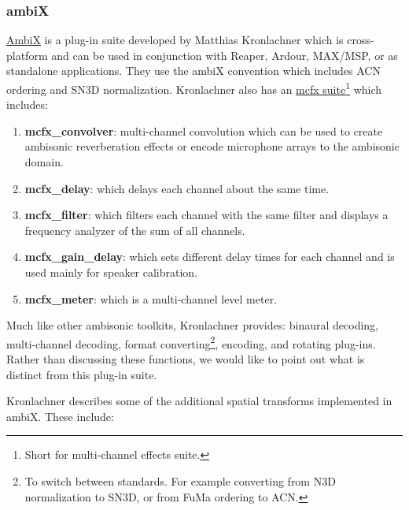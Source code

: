 
\subsubsection{ambiX}

\href{http://www.matthiaskronlachner.com/?p=2015}{AmbiX} is a plug-in suite developed by Matthias Kronlachner which is cross-platform and can be used in conjunction with Reaper, Ardour, MAX/MSP, or as standalone applications. They use the ambiX convention which includes ACN ordering and SN3D normalization. Kronlachner also has an \href{http://www.matthiaskronlachner.com/?p=1910}{mcfx suite}\footnote{Short for multi-channel effects suite.} which includes:

\begin{enumerate}
    \item \textbf{mcfx\_convolver}: multi-channel convolution which can be used to create ambisonic reverberation effects or encode microphone arrays to the ambisonic domain. 
    \item \textbf{mcfx\_delay}: which delays each channel about the same time.
    \item \textbf{mcfx\_filter}: which filters each channel with the same filter and displays a frequency analyzer of the sum of all channels.
    \item \textbf{mcfx\_gain\_delay}: which sets different delay times for each channel and is used mainly for speaker calibration.
    \item \textbf{mcfx\_meter}: which is a multi-channel level meter.
\end{enumerate}

Much like other ambisonic toolkits, Kronlachner provides: binaural decoding, multi-channel decoding, format converting\footnote{To switch between standards. For example converting from N3D normalization to SN3D, or from FuMa ordering to ACN.}, encoding, and rotating plug-ins. Rather than discussing these functions, we would like to point out what is distinct from this plug-in suite. 

Kronlachner \cite{kronlachner2014spatial} describes some of the additional spatial transforms implemented in ambiX. These include:

